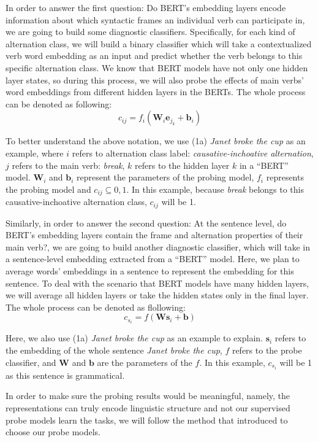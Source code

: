 \documentclass[11pt]{article}
\begin{document}
In order to answer the first question: Do BERT’s embedding layers encode information about which syntactic frames an individual verb can participate in, we are going to build some diagnostic classifiers. Specifically, for each kind of alternation class, we will build a binary classifier which will take a contextualized verb word embedding as an input and predict whether the verb belongs to this specific alternation class. We know that BERT models have not only one hidden layer states, so during this process, we will also probe the effects of main verbs' word embeddings from different hidden layers in the BERTs. The whole process can be denoted as following:
$$c_{ij} = f_{i}(\textbf{W}_i\textbf{e}_{j_k} +\textbf{b}_i)$$

 To better understand the above notation, we use (1a) \textit{Janet broke the cup} as an example, where $i$ refers to alternation class label:\textit{ causative-inchoative alternation}, $j$ refers to the main verb:\textit{ break}, $k$ refers to the hidden layer $k$ in a ``BERT'' model. $\textbf{W}_i$ and $\textbf{b}_i$ represent the parameters of the probing model, $f_{i}$ represents the probing model and $c_{ij}\subseteq {0,1}$. In this example, because \textit{break} belongs to this causative-inchoative alternation class, $c_{ij}$ will be 1.

Similarly, in order to answer the second question: At the sentence level, do BERT's embedding layers contain the frame and alternation properties of their main verb?, we are going to build another diagnostic classifier, which will take in a sentence-level embedding extracted from a ``BERT'' model. Here, we plan to average words' embeddings in a sentence to represent the embedding for this sentence. To deal with the scenario that BERT models have many hidden layers, we will average all hidden layers or take the hidden states only in the final layer. The whole process can be denoted as flollowing:
$$c_{{s}_{i}} = f(\textbf{W}\textbf{s}_{i} +\textbf{b})$$

Here, we also use (1a) \textit{Janet broke the cup} as an example to explain. $\textbf{s}_{i}$ refers to the embedding of the whole sentence \textit{Janet broke the cup}, $f$ refers to the probe classifier, and $\textbf{W}$ and $\textbf{b}$ are the parameters of the $f$. In this example, $c_{{s}_{i}}$ will be 1 as this sentence is grammatical.

In order to make sure the probing results would be meaningful, namely, the representations can truly encode linguistic structure and not our supervised probe models learn the tasks, we will follow the method that \citealt{hewitt2019designing} introduced to choose our probe models.
\end{document}
